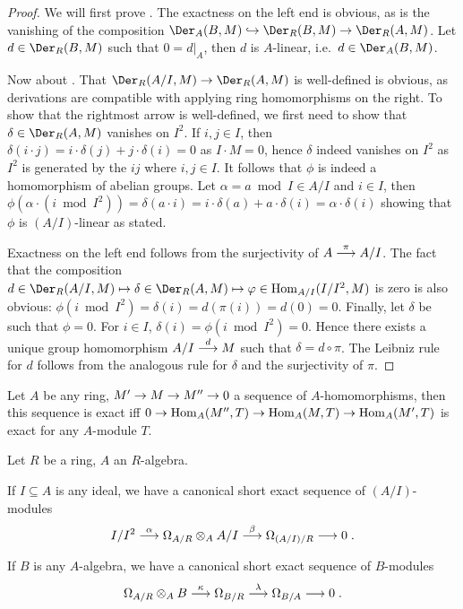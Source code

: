 \documentclass[a4paper,parskip=half,numbers=enddot, DIV=12]{scrreprt}
\begin{document}
\begin{proof}
    We will first prove . The exactness on the left end is obvious, as is the vanishing of the composition $\Der_A(B,M) \monomorphism \Der_R(B,M) \morphism \Der_R(A,M)$. Let $d\in \Der_R(B,M)$ such that $0 = d|_A$, then $d$ is $A$-linear, i.e.\ $d\in \Der_A(B,M)$.
    
    Now about . That $\Der_R(A/I,M) \morphism \Der_R(A,M)$ is well-defined is obvious, as derivations are compatible with applying ring homomorphisms on the right. To show that the rightmost arrow is well-defined, we first need to show that $\delta\in\Der_R(A,M)$ vanishes on $I^2$. If $i,j\in I$, then $\delta(i\cdot j)=i\cdot\delta(j)+j\cdot\delta(i)=0$ as $I\cdot M=0$, hence $\delta$ indeed vanishes on $I^2$ as $I^2$ is generated by the $ij$ where $i,j\in I$. It follows that $\phi$ is indeed a homomorphism of abelian groups. Let $\alpha = a\bmod I\in A/I$ and $i\in I$, then $\phi(\alpha \cdot (i\bmod I^2)) = \delta(a\cdot i) = i\cdot \delta(a) + a\cdot \delta(i) = \alpha\cdot\delta(i)$ showing that $\phi$ is $(A/I)$-linear as stated. 
    
    Exactness on the left end follows from the surjectivity of $A\morphism[\pi] A/I$. The fact that the composition $d\in\Der_R(A/I,M)\mapsto\delta\in\Der_R(A,M)\mapsto\phi\in\Hom_{A/I}(I/I^2,M)$ is zero is also obvious: $\phi(i\bmod I^2) = \delta(i) = d(\pi(i)) = d(0) = 0$. Finally, let $\delta$ be such that $\phi = 0$. For $i\in I$, $\delta(i) = \phi(i\bmod I^2) = 0$. Hence there exists a unique group homomorphism $A/I \morphism[d] M$ such that $\delta = d\circ \pi$. The Leibniz rule for $d$ follows from the analogous rule for $\delta$ and the surjectivity of $\pi$.
\end{proof}
\begin{fact*}
    Let $A$ be any ring, $M'\morphism M\morphism M''\morphism 0$ a sequence of $A$-homomorphisms, then this sequence is exact iff $0\morphism\Hom_A(M'',T) \morphism \Hom_A(M,T) \morphism\Hom_A(M',T)$ is exact for any $A$-module $T$.
\end{fact*}
\begin{cor}
    Let $R$ be a ring, $A$ an $R$-algebra. 
    \begin{alphanumerate}
        \item 
            If $I\subseteq A$ is any ideal, we have a canonical short exact sequence of $(A/I)$-modules
            \begin{align}\lbl{eq:tensorDerSpam1}
                I/I^2\morphism[\alpha] \Omega_{A/R} \otimes_A A/I \morphism[\beta] \Omega_{(A/I)/R} \morphism 0\;.
            \end{align}
        \item 
            If $B$ is any $A$-algebra, we have a canonical short exact sequence of $B$-modules
            \begin{align}\lbl{eq:tensorDerSpam2}
                \Omega_{A/R}\otimes_A B \morphism[\kappa] \Omega_{B/R} \morphism[\lambda] \Omega_{B/A} \morphism 0\;.
            \end{align}
    \end{alphanumerate}
\end{cor}
\end{document}
